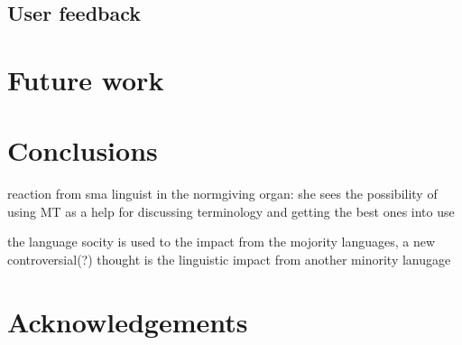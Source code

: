 \documentclass[a4paper,11pt,twocolumn]{article}
\begin{document}
\subsection{User feedback}

\section{Future work}
\section{Conclusions}
\item reaction from sma linguist in the normgiving organ: she sees the possibility of using MT as a help for discussing terminology and getting the best ones into use
\item the language socity is used to the impact from the mojority languages, a new controversial(?) thought is the linguistic impact from another minority lanugage 


\section*{Acknowledgements}



\end{document}
